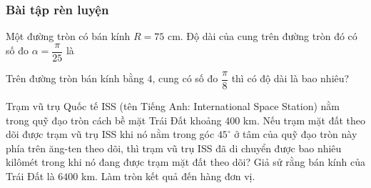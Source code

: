 \subsubsection{Bài tập rèn luyện}
\centerline{}
\begin{bt}%
	Một đường tròn có bán kính $R=75$ cm. Độ dài của cung trên đường tròn đó có số đo $\alpha =\dfrac{\pi}{25}$ là 
\end{bt}
\begin{bt}%
	Trên đường tròn bán kính bằng $4$, cung có số đo $\dfrac{\pi}{8}$ thì có độ dài là bao nhiêu? 
\end{bt}
\begin{bt}%
	Trạm vũ trụ Quốc tế ISS (tên Tiếng Anh: International Space Station) nằm trong quỹ đạo tròn cách bề mặt Trái Đất khoảng $400$ km. Nếu trạm mặt đất theo dõi được trạm vũ trụ ISS khi nó nằm trong góc $45^\circ$ ở tâm của quỹ đạo tròn này phía trên ăng-ten theo dõi, thì trạm vũ trụ ISS đã di chuyển được bao nhiêu kilômét trong khi nó đang được trạm mặt đất theo dõi? Giả sử rằng bán kính của Trái Đất là $6400$ km. Làm tròn kết quả đến hàng đơn vị. 
\end{bt}
